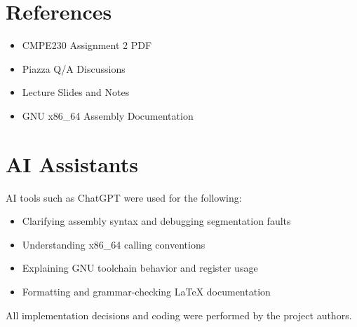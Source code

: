 \documentclass[11pt]{article}
\begin{document}
\section*{References}
\begin{itemize}[noitemsep]
    \item CMPE230 Assignment 2 PDF
    \item Piazza Q/A Discussions
    \item Lecture Slides and Notes
    \item GNU x86\_64 Assembly Documentation
\end{itemize}

\section*{AI Assistants}
AI tools such as ChatGPT were used for the following:
\begin{itemize}[noitemsep]
    \item Clarifying assembly syntax and debugging segmentation faults
    \item Understanding x86\_64 calling conventions
    \item Explaining GNU toolchain behavior and register usage
    \item Formatting and grammar-checking LaTeX documentation
\end{itemize}

All implementation decisions and coding were performed by the project authors.
\end{document}
